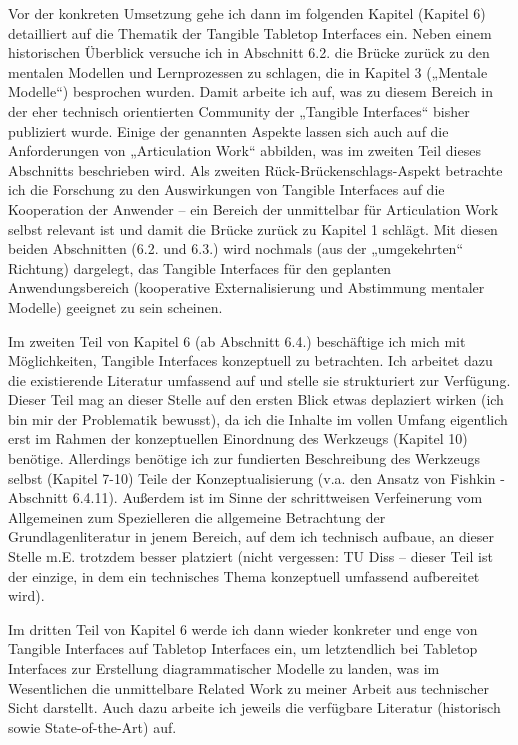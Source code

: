 \todo Vor der konkreten Umsetzung gehe ich dann im folgenden Kapitel (Kapitel 6) detailliert auf die Thematik der Tangible Tabletop Interfaces ein. Neben einem historischen Überblick versuche ich in Abschnitt 6.2. die Brücke zurück zu den mentalen Modellen und Lernprozessen zu schlagen, die in Kapitel 3 („Mentale Modelle“) besprochen wurden. Damit arbeite ich auf, was zu diesem Bereich in der eher technisch orientierten Community der „Tangible Interfaces“ bisher publiziert wurde. Einige der genannten Aspekte lassen sich auch auf die Anforderungen von „Articulation Work“ abbilden, was im zweiten Teil dieses Abschnitts beschrieben wird. Als zweiten Rück-Brückenschlags-Aspekt betrachte ich die Forschung zu den Auswirkungen von Tangible Interfaces auf die Kooperation der Anwender – ein Bereich der unmittelbar für Articulation Work selbst relevant ist und damit die Brücke zurück zu Kapitel 1 schlägt. Mit diesen beiden Abschnitten (6.2. und 6.3.) wird nochmals (aus der „umgekehrten“ Richtung) dargelegt, das Tangible Interfaces für den geplanten Anwendungsbereich (kooperative Externalisierung und Abstimmung mentaler Modelle) geeignet zu sein scheinen.

\todo Im zweiten Teil von Kapitel 6 (ab Abschnitt 6.4.) beschäftige ich mich mit Möglichkeiten, Tangible Interfaces konzeptuell zu betrachten. Ich arbeitet dazu die existierende Literatur umfassend auf und stelle sie strukturiert zur Verfügung. Dieser Teil mag an dieser Stelle auf den ersten Blick etwas deplaziert wirken (ich bin mir der Problematik bewusst), da ich die Inhalte im vollen Umfang eigentlich erst im Rahmen der konzeptuellen Einordnung des Werkzeugs (Kapitel 10) benötige. Allerdings benötige ich zur fundierten Beschreibung des Werkzeugs selbst (Kapitel 7-10) Teile der Konzeptualisierung (v.a. den Ansatz von Fishkin - Abschnitt 6.4.11). Außerdem ist im Sinne der schrittweisen Verfeinerung vom Allgemeinen zum Spezielleren die allgemeine Betrachtung der Grundlagenliteratur in jenem Bereich, auf dem ich technisch aufbaue, an dieser Stelle m.E. trotzdem besser platziert (nicht vergessen: TU Diss – dieser Teil ist der einzige, in dem ein technisches Thema konzeptuell umfassend aufbereitet wird). 

\todo Im dritten Teil von Kapitel 6 werde ich dann wieder konkreter und enge von Tangible Interfaces auf Tabletop Interfaces ein, um letztendlich bei Tabletop Interfaces zur Erstellung diagrammatischer Modelle zu landen, was im Wesentlichen die unmittelbare Related Work zu meiner Arbeit aus technischer Sicht darstellt. Auch dazu arbeite ich jeweils die verfügbare Literatur (historisch sowie State-of-the-Art) auf.

